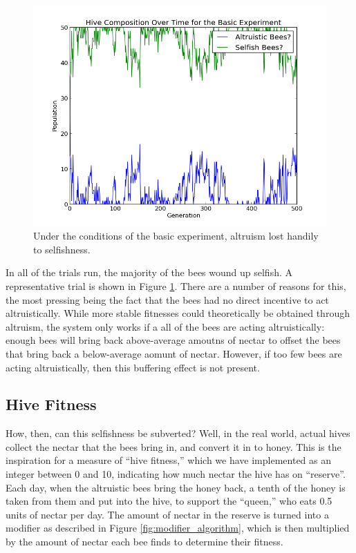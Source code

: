 \documentclass[11pt]{article}
\begin{document}
			\begin{figure}[tb]
				\begin{center}
					\includegraphics[scale=.5]{results/basic_comp.png}
				\end{center}
				\caption{Under the conditions of the basic experiment, altruism lost handily to selfishness.}
				\label{fig:basic_experiment_composition}
			\end{figure}

			In all of the trials run, the majority of the bees wound up selfish. A representative trial is shown in Figure \ref{fig:basic_experiment_composition}. There are a number of reasons for this, the most pressing being the fact that the bees had no direct incentive to act altruistically. While more stable fitnesses could theoretically be obtained through altruism, the system only works if a all of the bees are acting altruistically: enough bees will bring back above-average amoutns of nectar to offset the bees that bring back a below-average aomunt of nectar. However, if too few bees are acting altruistically, then this buffering effect is not present. 



		\subsection{Hive Fitness} %
		\label{sub:hive_fitness}
			How, then, can this selfishness be subverted? Well, in the real world, actual hives collect the nectar that the bees bring in, and convert it in to honey. This is the inspiration for a measure of ``hive fitness,'' which we have implemented as an integer between 0 and 10, indicating how much nectar the hive has on ``reserve''. Each day, when the altruistic bees bring the honey back, a tenth of the honey is taken from them and put into the hive, to support the ``queen,'' who eats 0.5 units of nectar per day. The amount of nectar in the reserve is turned into a modifier as described in Figure \ref{fig:modifier_algorithm}, which is then multiplied by the amount of nectar each bee finds to determine their fitness.
\end{document}
